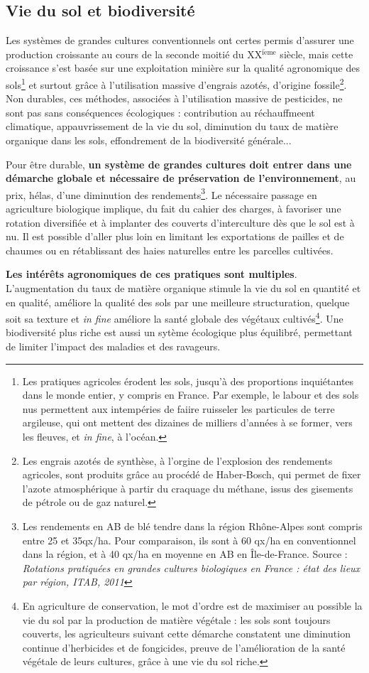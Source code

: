 \documentclass{book}
\begin{document}
\subsection{Vie du sol et biodiversité}

Les systèmes de grandes cultures conventionnels ont certes permis d'assurer une production croissante au cours de la seconde moitié du XX$^{\mathrm{i\grave{e}me}}$ siècle, mais cette croissance s'est basée sur une exploitation minière sur la qualité agronomique des sols\footnote{Les pratiques agricoles érodent les sols, jusqu'à des proportions inquiétantes dans le monde entier, y compris en France. Par exemple, le labour et des sols nus permettent aux intempéries de faiire ruisseler les particules de terre argileuse, qui ont mettent des dizaines de milliers d'années à se former, vers les fleuves, et \textit{in fine}, à l'océan.} et surtout grâce à l'utilisation massive d'engrais azotés, d'origine fossile\footnote{Les engrais azotés de synthèse, à l'orgine de l'explosion des rendements agricoles, sont produits grâce au procédé de Haber-Bosch, qui permet de fixer l'azote atmosphérique à partir du craquage du méthane, issus des gisements de pétrole ou de gaz naturel.}. Non durables, ces méthodes, associées à l'utilisation massive de pesticides, ne sont pas sans conséquences écologiques : contribution au réchauffmeent climatique, appauvrissement de la vie du sol, diminution du taux de matière organique dans les sols, effondrement de la biodiversité générale...

Pour être durable, \textbf{un système de grandes cultures doit entrer dans une démarche globale et nécessaire de préservation de l'environnement}, au prix, hélas, d'une diminution des rendements\footnote{Les rendements en AB de blé tendre dans la région Rhône-Alpes sont compris entre 25 et 35qx/ha. Pour comparaison, ils sont à 60 qx/ha en conventionnel dans la région, et à 40 qx/ha en moyenne en AB en Île-de-France. Source : \textit{Rotations pratiquées en grandes cultures biologiques en France : état des lieux par région, ITAB, 2011}}. Le nécessaire passage en agriculture biologique implique, du fait du cahier des charges, à favoriser une rotation diversifiée et à implanter des couverts d'interculture dès que le sol est à nu. Il est possible d'aller plus loin en limitant les exportations de pailles et de chaumes ou en rétablissant des haies naturelles entre les parcelles cultivées.

\textbf{Les intérêts agronomiques de ces pratiques sont multiples}. L'augmentation du taux de matière organique stimule la vie du sol en quantité et en qualité, améliore la qualité des sols par une meilleure structuration, quelque soit sa texture et \textit{in fine} améliore la santé globale des végétaux cultivés\footnote{En agriculture de conservation, le mot d'ordre est de maximiser au possible la vie du sol par la production de matière végétale : les sols sont toujours couverts, les agriculteurs suivant cette démarche constatent une diminution continue d'herbicides et de fongicides, preuve de l'amélioration de la santé végétale de leurs cultures, grâce à une vie du sol riche.}. Une biodiversité plus riche est aussi un sytème écologique plus équilibré, permettant de limiter l'impact des maladies et des ravageurs.
\end{document}
